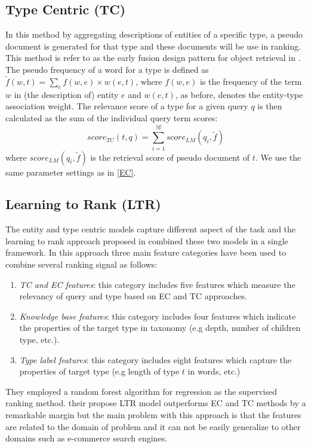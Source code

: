 \subsection{Type Centric (TC)}
In this method by aggregating descriptions of entities of a specific type, a pseudo document is generated for that type and these documents will be use in ranking. This method is refer to as the early fusion design pattern for object retrieval in \cite{22hasibi}. The pseudo frequency of a word for a type is defined as 
$\tilde{f}(w,t) = \sum_{e}{f(w,e)\times w(e,t)}$, where $f(w,e)$ is the frequency of the term $w$ in (the description of) entity $e$ and $w(e,t)$, as before, denotes the entity-type association weight. The relevance score of a type for a given query $q$ is then calculated as the sum of the individual query term scores:
\begin{equation}
score_{TC}(t,q) = \sum_{i=1}^{|q|}{score_{LM}(q_i,\tilde{f})}
\end{equation}
where $score_{LM}(q_i,\tilde{f})$ is the retrieval score of pseudo document of $t$. We use the same parameter settings as in \ref{EC}.

\subsection{Learning to Rank (LTR)}
The entity and type centric models capture different aspect of the task and the learning to rank approach proposed in \cite{hasibiSig17} combined these two models in a single framework. In this approach three main feature categories have been used to combine several ranking signal as follows:
\begin{enumerate}
	\item \textit{TC and EC features}: this category includes five features which measure the relevancy of query and type based on EC and TC approaches.
	\item \textit{Knowledge base features}: this category includes four features which indicate the properties of the target type in taxonomy (e.g depth, number of children type, etc.).
	\item \textit{Type label features}: this category includes eight features which capture the properties of target type (e.g length of type $t$ in words, etc.)
\end{enumerate}
They employed a random forest algorithm for regression as the supervised ranking method. their propose LTR model outperforms EC and TC methods by a remarkable margin but the main problem with this approach is that the features are related to the domain of problem and it can not be easily generalize to  other domains such as e-commerce search engines.

